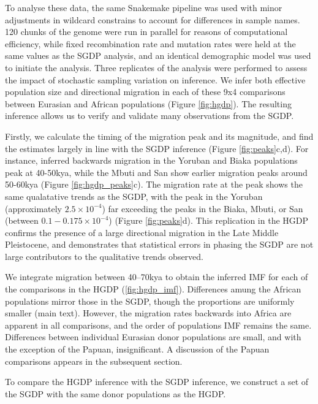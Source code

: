 \documentclass{article}
\begin{document}
To analyse these data, the same Snakemake pipeline was used with minor adjustments in wildcard constrains to account for differences in sample names. 120 chunks of the genome were run in parallel for reasons of computational efficiency, while fixed recombination rate and mutation rates were held at the same values as the SGDP analysis, and an identical demographic model was used to initiate the analysis. Three replicates of the analysis were performed to assess the impact of stochastic sampling variation on inference. We infer both effective population size and directional migration in each of these 9x4 comparisons between Eurasian and African populations (Figure \ref{fig:hgdp}). The resulting inference allows us to verify and validate many observations from the SGDP.

Firstly, we calculate the timing of the migration peak and its magnitude, and find the estimates largely in line with the SGDP inference (Figure \ref{fig:peaks}c,d). For instance, inferred backwards migration in the Yoruban and Biaka populations peak at 40-50kya, while the Mbuti and San show earlier migration peaks around 50-60kya (Figure \ref{fig:hgdp_peaks}c). The migration rate at the peak shows the same qualatative trends as the SGDP, with the peak in the Yoruban (approximately $2.5\times10^{-4}$) far exceeding the peaks in the Biaka, Mbuti, or San (between $0.1-0.175\times10^{-4}$) (Figure \ref{fig:peaks}d). This replication in the HGDP confirms the presence of a large directional migration in the Late Middle Pleistocene, and demonstrates that statistical errors in phasing the SGDP are not large contributors to the qualitative trends observed. 

We integrate migration between 40--70kya to obtain the inferred IMF for each of the comparisons in the HGDP (\ref{fig:hgdp_imf}). Differences amung the African populations mirror those in the SGDP, though the proportions are uniformly smaller (main text). However, the migration rates backwards into Africa are apparent in all comparisons, and the order of populations IMF remains the same. Differences between individual Eurasian donor populations are small, and with the exception of the Papuan, insignificant. A discussion of the Papuan comparisons appears in the subsequent section.  

To compare the HGDP inference with the SGDP inference, we construct a set of the SGDP with the same donor populations as the HGDP.



\end{document}
